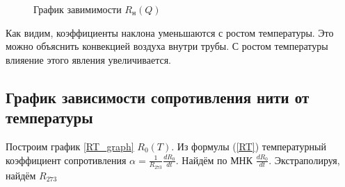 \documentclass[a4paper, 12pt]{article}
\begin{document}
            \begin{figure}[ht]
                \caption{График завимимости $R_н(Q)$}
                \label{RQ_graph}
            \end{figure}

            Как видим, коэффициенты наклона уменьшаются с ростом температуры. Это можно объяснить конвекцией воздуха внутри трубы. С ростом температуры влияение этого явления увеличивается.

        \subsection{График зависимости сопротивления нити от температуры}

            Построим график \ref{RT_graph} $R_0(T)$. Из формулы (\ref{RT}) температурный коэффициент сопротивления $\alpha = \frac{1}{R_{273}}\frac{dR_0}{dt}$. Найдём по МНК $\frac{dR_0}{dt}$. Экстраполируя, найдём $R_{273}$
\end{document}
